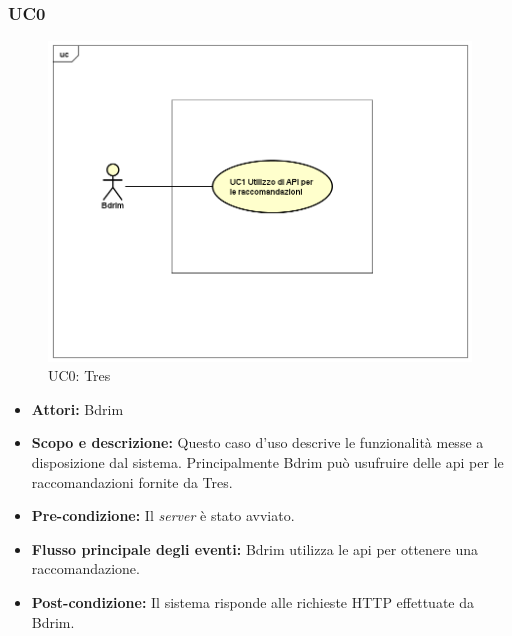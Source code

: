 \subsubsection{UC0}
\begin{figure}[h]
\centering
\includegraphics[scale=0.42]{immagini/UC0a}
\caption{UC0: Tres}
\label{fig:UC0}
\end{figure}
\begin{itemize}
\item \textbf{Attori:} Bdrim
\item \textbf{Scopo e descrizione:} Questo caso d'uso descrive le funzionalità messe a disposizione dal sistema. Principalmente Bdrim può usufruire delle \gls{api} per le raccomandazioni fornite da Tres.
\item \textbf{Pre-condizione:} Il \emph{server} è stato avviato.
\item \textbf{Flusso principale degli eventi:} Bdrim utilizza le \gls{api} per ottenere una raccomandazione.
\item \textbf{Post-condizione:} Il sistema risponde alle richieste HTTP effettuate da Bdrim.
\end{itemize}
\newpage
